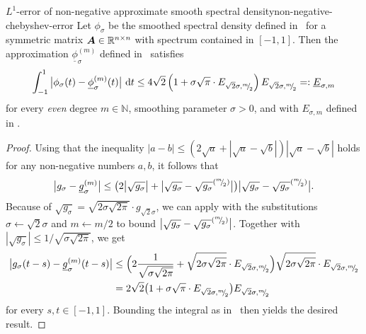 \begin{lemma}{$L^1$-error of non-negative approximate smooth spectral density}{non-negative-chebyshev-error}
Let $\phi_{\sigma}$ be the smoothed spectral density defined in~
for a symmetric matrix $\boldsymbol{A} \in \mathbb{R}^{n \times n}$ with spectrum contained in $[-1, 1]$. Then the approximation $\underline{\phi}_{\sigma}^{(m)}$ defined in~ satisfies
    \begin{equation}
        \int_{-1}^{1} \big| \phi_{\sigma}(t) - \underline{\phi}_{\sigma}^{(m)}(t) \big|~\mathrm{d}t \leq 4 \sqrt{2} \left(1 + \sigma \sqrt{\pi} \cdot E_{\sqrt{2}\sigma, {}^{m}{\mskip -5mu/\mskip -3mu}_{2}}\right) E_{\sqrt{2}\sigma, {}^{m}{\mskip -5mu/\mskip -3mu}_{2}} =: \underline{E}_{\sigma, m}
        \label{equ:chebyshev-interpolation-sup-error-kernel-nonneg}
    \end{equation}
    for every \emph{even} degree $m \in \mathbb{N}$, smoothing parameter $\sigma > 0$, and with $E_{\sigma, m}$ defined in .
\end{lemma}
\begin{proof}
    Using that the inequality $| a - b | \leq (2 \sqrt{a} + | \sqrt{a} - \sqrt{b} |)  | \sqrt{a} - \sqrt{b} |$ holds for any non-negative numbers $a, b$, it follows that
    \begin{equation}
        \big| g_{\sigma} - \underline{g}_{\sigma}^{(m)} \big| \leq \big( 2 \big| \sqrt{g_{\sigma}} \big| + \big| \sqrt{g_{\sigma}} - \sqrt{g_{\sigma}}^{({}^{m}{\mskip -5mu/\mskip -3mu}_{2})} \big| \big) \big| \sqrt{g_{\sigma}} - \sqrt{g_{\sigma}}^{({}^{m}{\mskip -5mu/\mskip -3mu}_{2})} \big|.
    \end{equation}
    Because of $\sqrt{g_{\sigma}} = \sqrt{2 \sigma \sqrt{2 \pi}} \cdot g_{\sqrt{2}\sigma}$,
we can apply  with the substitutions
    $\sigma \gets \sqrt{2}\sigma$ and $m \gets m/2$ to bound 
    $\big| \sqrt{g_{\sigma}} - \sqrt{g_{\sigma}}^{({}^{m}{\mskip -5mu/\mskip -3mu}_{2})} \big|$.
    Together with  $|\sqrt{g_{\sigma}}| \leq 1/\sqrt{\sigma \sqrt{2 \pi}}$, we get
    \begin{align}
        \big| g_{\sigma}(t - s) - \underline{g}_{\sigma}^{(m)}(t - s) \big| \notag 
        &\leq \Big( 2 \frac{1}{\sqrt{ \sigma \sqrt{2\pi}}} + \sqrt{2 \sigma \sqrt{2 \pi}} \cdot E_{\sqrt{2}\sigma, {}^{m}{\mskip -5mu/\mskip -3mu}_{2}}\Big)\sqrt{2 \sigma \sqrt{2 \pi}} \cdot E_{\sqrt{2}\sigma, {}^{m}{\mskip -5mu/\mskip -3mu}_{2}} \notag \\
        &= 2\sqrt{2} \big(1 + \sigma \sqrt{\pi} \cdot E_{\sqrt{2}\sigma, {}^{m}{\mskip -5mu/\mskip -3mu}_{2}}\big) E_{\sqrt{2}\sigma, {}^{m}{\mskip -5mu/\mskip -3mu}_{2}}
    \end{align}
    for every $s,t \in [-1, 1]$.
    Bounding the integral as in~ then yields the desired result.
\end{proof}


